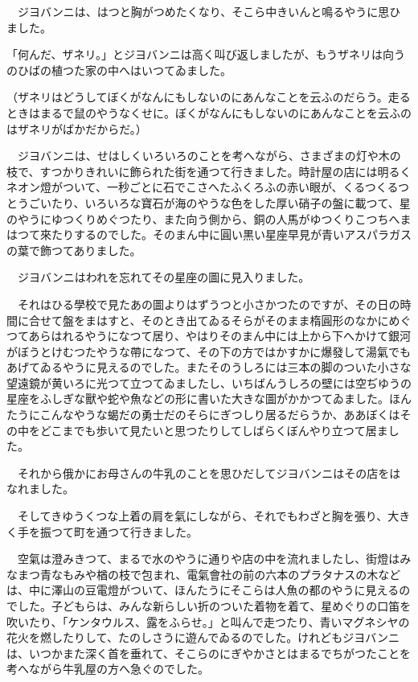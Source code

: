 \documentclass[tate,paper=b6j,jafontsize=9pt]{jlreq}
\begin{document}
　ジヨバンニは、はつと胸がつめたくなり、そこら中きいんと鳴るやうに思ひました。

「何んだ、ザネリ。」とジヨバンニは高く叫び返しましたが、もうザネリは向うのひばの植つた家の中へはいつてゐました。

（ザネリはどうしてぼくがなんにもしないのにあんなことを云ふのだらう。走るときはまるで鼠のやうなくせに。ぼくがなんにもしないのにあんなことを云ふのはザネリがばかだからだ。）

　ジヨバンニは、せはしくいろいろのことを考へながら、さまざまの灯や木の枝で、すつかりきれいに飾られた街を通つて行きました。時計屋の店には明るくネオン燈がついて、一秒ごとに石でこさへたふくろふの赤い眼が、くるつくるつとうごいたり、いろいろな寶石が海のやうな色をした厚い硝子の盤に載つて、星のやうにゆつくりめぐつたり、また向う側から、銅の人馬がゆつくりこつちへまはつて來たりするのでした。そのまん中に圓い黒い星座早見が青いアスパラガスの葉で飾つてありました。

　ジヨバンニはわれを忘れてその星座の圖に見入りました。

　それはひる學校で見たあの圖よりはずうつと小さかつたのですが、その日の時間に合せて盤をまはすと、そのとき出てゐるそらがそのまま楕圓形のなかにめぐつてあらはれるやうになつて居り、やはりそのまん中には上から下へかけて銀河がぼうとけむつたやうな帶になつて、その下の方ではかすかに爆發して湯氣でもあげてゐるやうに見えるのでした。またそのうしろには三本の脚のついた小さな望遠鏡が黄いろに光つて立つてゐましたし、いちばんうしろの壁には空ぢゆうの星座をふしぎな獸や蛇や魚などの形に書いた大きな圖がかかつてゐました。ほんたうにこんなやうな蝎だの勇士だのそらにぎつしり居るだらうか、ああぼくはその中をどこまでも歩いて見たいと思つたりしてしばらくぼんやり立つて居ました。

　それから俄かにお母さんの牛乳のことを思ひだしてジヨバンニはその店をはなれました。

　そしてきゆうくつな上着の肩を氣にしながら、それでもわざと胸を張り、大きく手を振つて町を通つて行きました。

　空氣は澄みきつて、まるで水のやうに通りや店の中を流れましたし、街燈はみなまつ青なもみや楢の枝で包まれ、電氣會社の前の六本のプラタナスの木などは、中に澤山の豆電燈がついて、ほんたうにそこらは人魚の都のやうに見えるのでした。子どもらは、みんな新らしい折のついた着物を着て、星めぐりの口笛を吹いたり、「ケンタウルス、露をふらせ。」と叫んで走つたり、青いマグネシヤの花火を燃したりして、たのしさうに遊んでゐるのでした。けれどもジヨバンニは、いつかまた深く首を垂れて、そこらのにぎやかさとはまるでちがつたことを考へながら牛乳屋の方へ急ぐのでした。
\end{document}
